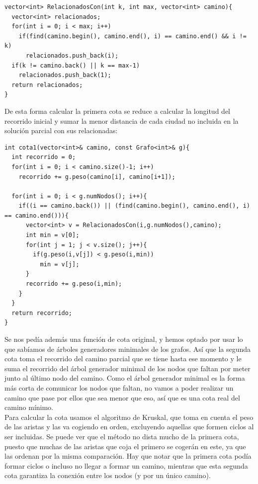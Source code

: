 \begin{lstlisting}
vector<int> RelacionadosCon(int k, int max, vector<int> camino){
  vector<int> relacionados;
  for(int i = 0; i < max; i++)
    if(find(camino.begin(), camino.end(), i) == camino.end() && i != k)
      relacionados.push_back(i);
  if(k != camino.back() || k == max-1)
    relacionados.push_back(1);
  return relacionados;
}
\end{lstlisting}

De esta forma calcular la primera cota se reduce a calcular la longitud del recorrido inicial y sumar la menor distancia de cada ciudad no incluida en la solución parcial con sus relacionadas:

\begin{lstlisting}
int cota1(vector<int>& camino, const Grafo<int>& g){
  int recorrido = 0;
  for(int i = 0; i < camino.size()-1; i++)
    recorrido += g.peso(camino[i], camino[i+1]);

  for(int i = 0; i < g.numNodos(); i++){
    if((i == camino.back()) || (find(camino.begin(), camino.end(), i) == camino.end())){
      vector<int> v = RelacionadosCon(i,g.numNodos(),camino);
      int min = v[0];
      for(int j = 1; j < v.size(); j++){
        if(g.peso(i,v[j]) < g.peso(i,min))
          min = v[j];
      }
      recorrido += g.peso(i,min);
    }
  }
  return recorrido;
}
\end{lstlisting}

Se nos pedía además una función de cota original, y hemos optado por usar lo que sabíamos de árboles generadores minimales de los grafos. Así que la segunda cota toma el recorrido del camino parcial que se tiene hasta ese momento y le suma el recorrido del árbol generador minimal de los nodos que faltan por meter junto al último nodo del camino. Como el árbol generador minimal es la forma más corta de comunicar los nodos que faltan, no vamos a poder realizar un camino que pase por ellos que sea menor que eso, así que es una cota real del camino mínimo. \\

Para calcular la cota usamos el algoritmo de Kruskal, que toma en cuenta el peso de las aristas y las va cogiendo en orden, excluyendo aquellas que formen ciclos al ser incluidas. Se puede ver que el método no dista mucho de la primera cota, puesto que muchas de las aristas que coja el primero se cogerán en este, ya que las ordenan por la misma comparación. Hay que notar que la primera cota podía formar ciclos o incluso no llegar a formar un camino, mientras que esta segunda cota garantiza la conexión entre los nodos (y por un único camino). \\

